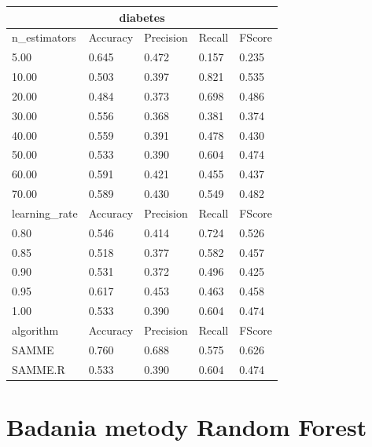 \documentclass[12pt,a4paper]{article}
\begin{document}
\begin{tabular}{ |p{3cm}||p{2cm}|p{2cm}|p{2cm}|p{2cm}| }
\hline
\multicolumn{5}{|c|}{diabetes}\\
\hline
n\_estimators & Accuracy & Precision & Recall & FScore \\
\hline
5.00 & 0.645 & 0.472 & 0.157 & 0.235\\
10.00 & 0.503 & 0.397 & 0.821 & 0.535\\
20.00 & 0.484 & 0.373 & 0.698 & 0.486\\
30.00 & 0.556 & 0.368 & 0.381 & 0.374\\
40.00 & 0.559 & 0.391 & 0.478 & 0.430\\
50.00 & 0.533 & 0.390 & 0.604 & 0.474\\
60.00 & 0.591 & 0.421 & 0.455 & 0.437\\
70.00 & 0.589 & 0.430 & 0.549 & 0.482\\
\hline
learning\_rate & Accuracy & Precision & Recall & FScore \\
\hline
0.80 & 0.546 & 0.414 & 0.724 & 0.526\\
0.85 & 0.518 & 0.377 & 0.582 & 0.457\\
0.90 & 0.531 & 0.372 & 0.496 & 0.425\\
0.95 & 0.617 & 0.453 & 0.463 & 0.458\\
1.00 & 0.533 & 0.390 & 0.604 & 0.474\\
\hline
algorithm & Accuracy & Precision & Recall & FScore \\
\hline
SAMME & 0.760 & 0.688 & 0.575 & 0.626\\
SAMME.R & 0.533 & 0.390 & 0.604 & 0.474\\
\hline
\end{tabular}

\section{Badania metody Random Forest}
\end{document}
